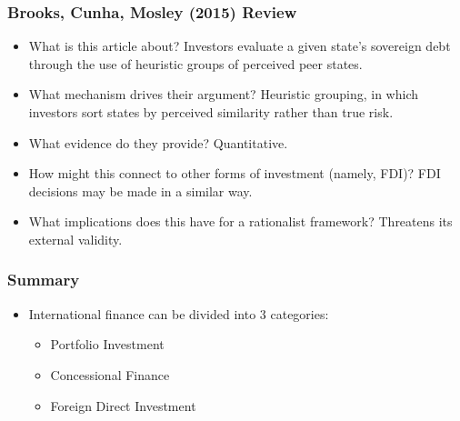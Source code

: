 \documentclass{beamer}
\begin{document}
		
		
		

\begin{frame} 
	\frametitle{\LARGE{Brooks, Cunha, Mosley (2015) Review}}
	\begin{itemize}
		\item What is this article about? \pause Investors evaluate a given state's sovereign debt through the use of heuristic groups of perceived peer states. 
		
		\item What mechanism drives their argument? \pause Heuristic grouping, in which investors sort states by perceived similarity rather than true risk.
		
		\item What evidence do they provide? \pause Quantitative.
		
		\item How might this connect to other forms of investment (namely, FDI)? \pause FDI decisions may be made in a similar way.
		
		\item What implications does this have for a rationalist framework? \pause Threatens its external validity.
	\end{itemize}
\end{frame}

\begin{frame} 
\frametitle{\LARGE{Summary}}
\begin{itemize}
	\item International finance can be divided into 3 categories: 
	\begin{itemize}
		\item Portfolio Investment
		\item Concessional Finance 
		\item Foreign Direct Investment
	\end{itemize} 
\end{itemize}
\end{frame}
\end{document}
